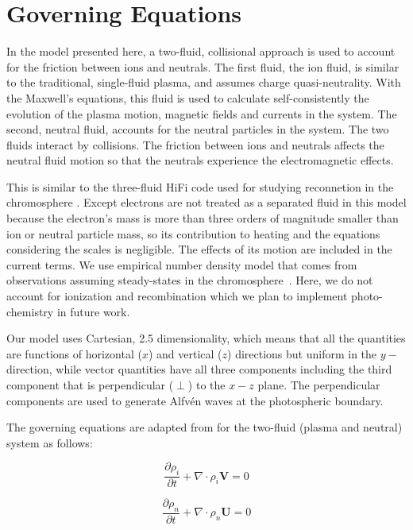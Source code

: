 \documentclass[12pt,upcase]{umlthesis}
\begin{document}
\section{Governing Equations}\label{sec:governingeq}

In the model presented here, a two-fluid, collisional approach is used to account for the friction between ions and neutrals. The first fluid, the ion fluid, is similar to the traditional, single-fluid plasma, and assumes charge quasi-neutrality. With the Maxwell's equations, this fluid is used to calculate self-consistently the evolution of the plasma motion, magnetic fields and currents in the system. The second, neutral fluid, accounts for the neutral particles in the system. The two fluids interact by collisions. The friction between ions and neutrals affects the neutral fluid motion so that the neutrals experience the electromagnetic effects. 

This is similar to the three-fluid HiFi code used for studying reconnetion in the chromosphere \citep{Leake2012}. Except electrons are not treated as a separated fluid in this model because the electron's mass is more than three orders of magnitude smaller than ion or neutral particle mass, so its contribution to heating and the equations considering the scales is negligible. The effects of its motion are included in the current terms. We use empirical number density model that comes from observations assuming steady-states in the chromosphere~\citep{AvrettLoeser2008}. Here, we do not account for ionization and recombination which we plan to implement photo-chemistry in future work.

Our model uses Cartesian, 2.5 dimensionality, which means that all the quantities are functions of horizontal ($x$) and vertical ($z$) directions but uniform in the $y-$ direction, while vector quantities  have all three components including the third component that is perpendicular ($\perp$) to the $x-z$ plane. The perpendicular components are used to generate Alfv\'en waves at the photospheric boundary. 

The governing equations are adapted from \citet{Tu2016} for the two-fluid (plasma and neutral) system as follows:

\begin{equation}
	\frac{\partial \rho_i}{\partial t} + \nabla \cdot \rho_i \textbf{V} = 0
\end{equation}

\begin{equation}
	\frac{\partial \rho_n}{\partial t} + \nabla \cdot \rho_n \textbf{U} = 0
\end{equation}
\end{document}
